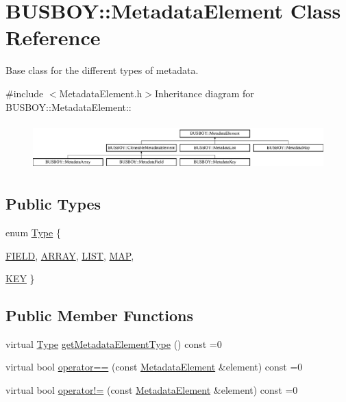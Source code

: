 \hypertarget{classBUSBOY_1_1MetadataElement}{
\section{BUSBOY::MetadataElement Class Reference}
\label{classBUSBOY_1_1MetadataElement}
}


Base class for the different types of metadata.  


{\ttfamily \#include $<$MetadataElement.h$>$}Inheritance diagram for BUSBOY::MetadataElement::\begin{figure}[H]
\begin{center}
\leavevmode
\includegraphics[height=1.82609cm]{classBUSBOY_1_1MetadataElement}
\end{center}
\end{figure}
\subsection*{Public Types}
\begin{DoxyCompactItemize}
\item 
enum \hyperlink{classBUSBOY_1_1MetadataElement_ab66bf575c7d26f857a2871d42bd97d12}{Type} \{ \par
\hyperlink{classBUSBOY_1_1MetadataElement_ab66bf575c7d26f857a2871d42bd97d12aadd64fda57e8ba7a46a5d86e0b00c64f}{FIELD}, 
\hyperlink{classBUSBOY_1_1MetadataElement_ab66bf575c7d26f857a2871d42bd97d12a57cff7a6570df185fc3cd8f2eba33ba5}{ARRAY}, 
\hyperlink{classBUSBOY_1_1MetadataElement_ab66bf575c7d26f857a2871d42bd97d12af5c9130caeec98fc4bce92db8b0afcd6}{LIST}, 
\hyperlink{classBUSBOY_1_1MetadataElement_ab66bf575c7d26f857a2871d42bd97d12a1356e0e0985619afde22f5a5c0d94ec1}{MAP}, 
\par
\hyperlink{classBUSBOY_1_1MetadataElement_ab66bf575c7d26f857a2871d42bd97d12a9d7d5960abd8febde4cd4ec2bb0ea3f5}{KEY}
 \}
\end{DoxyCompactItemize}
\subsection*{Public Member Functions}
\begin{DoxyCompactItemize}
\item 
virtual \hyperlink{classBUSBOY_1_1MetadataElement_ab66bf575c7d26f857a2871d42bd97d12}{Type} \hyperlink{classBUSBOY_1_1MetadataElement_a048a64f1d70affc5bfdd78a9958c5fb9}{getMetadataElementType} () const =0
\item 
virtual bool \hyperlink{classBUSBOY_1_1MetadataElement_ac56f20521c49259ff043c2d69bc4c08e}{operator==} (const \hyperlink{classBUSBOY_1_1MetadataElement}{MetadataElement} \&element) const =0
\item 
virtual bool \hyperlink{classBUSBOY_1_1MetadataElement_a9895dfd3f251e26e8d818871405ce4c7}{operator!=} (const \hyperlink{classBUSBOY_1_1MetadataElement}{MetadataElement} \&element) const =0
\end{DoxyCompactItemize}

